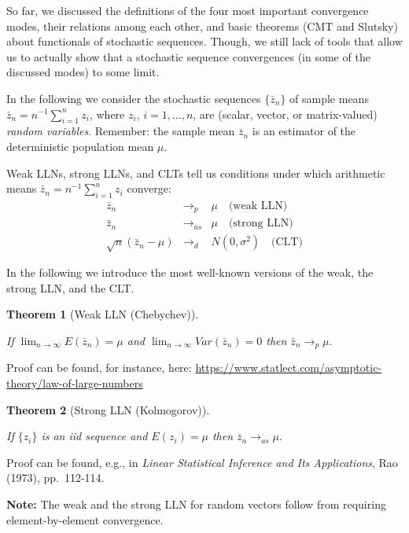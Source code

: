 \documentclass[
  letterpaper,
  DIV=11,
  numbers=noendperiod]{scrreprt}
\theoremstyle{definition}
\theoremstyle{plain}
\newtheorem{theorem}{Theorem}[chapter]
\theoremstyle{plain}
\theoremstyle{remark}
\begin{document}
So far, we discussed the definitions of the four most important
convergence modes, their relations among each other, and basic theorems
(CMT and Slutsky) about functionals of stochastic sequences. Though, we
still lack of tools that allow us to actually show that a stochastic
sequence convergences (in some of the discussed modes) to some limit.

In the following we consider the stochastic sequences \(\{\bar{z}_n\}\)
of sample means \(\bar{z}_n=n^{-1}\sum_{i=1}^nz_i\), where \(z_i\),
\(i=1,\dots,n\), are (scalar, vector, or matrix-valued) \emph{random
variables}. Remember: the sample mean \(\bar{z}_n\) is an estimator of
the deterministic population mean \(\mu\).

Weak LLNs, strong LLNs, and CLTs tell us conditions under which
arithmetic means \(\bar{z}_n=n^{-1}\sum_{i=1}^nz_i\) converge:
\begin{eqnarray*}
  \bar{z}_n&\to_{p}&\mu\quad\text{(weak LLN)}\\
  \bar{z}_n&\to_{as}&\mu\quad\text{(strong LLN)}\\
  \sqrt{n}(\bar{z}_n-\mu)&\to_{d}&N(0,\sigma^2)\quad\text{(CLT)}
\end{eqnarray*}

In the following we introduce the most well-known versions of the weak,
the strong LLN, and the CLT.

\leavevmode{}%
\begin{theorem}[Weak LLN (Chebychev)]\label{thm-WLLN1}

If \(\lim_{n\to\infty} E(\bar{z}_n)=\mu\) and
\(\lim_{n\to\infty}Var(\bar{z}_n)=0\) then \(\bar{z}_n\to_{p}\mu.\)

\end{theorem}

Proof can be found, for instance, here:
\url{https://www.statlect.com/asymptotic-theory/law-of-large-numbers}

\leavevmode{}%
\begin{theorem}[Strong LLN (Kolmogorov)]\label{thm-SLLN1}

If \(\{z_i\}\) is an iid sequence and \(E(z_i)=\mu\) then
\(\bar{z}_n\to_{as}\mu.\)

\end{theorem}

Proof can be found, e.g., in \emph{Linear Statistical Inference and Its
Applications}, Rao (1973), pp.~112-114.

\textbf{Note:} The weak and the strong LLN for random vectors follow
from requiring element-by-element convergence.
\end{document}
